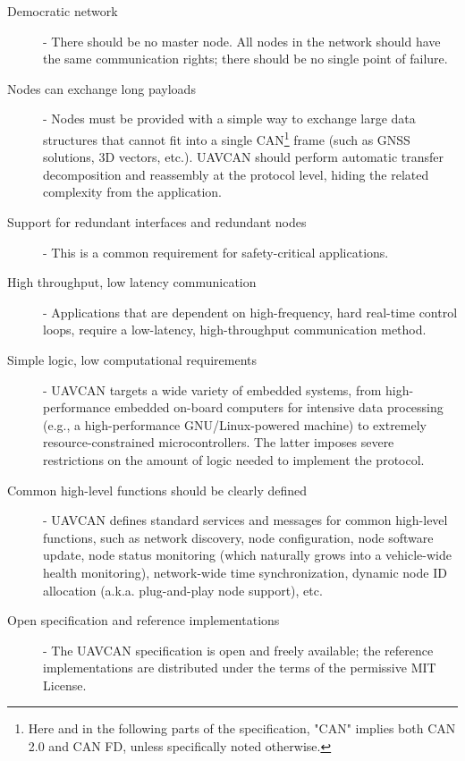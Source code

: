 \begin{description}
    \item[Democratic network] - There should be no master node.
    All nodes in the network should have the same communication rights; there should be no single point of failure.

    \item[Nodes can exchange long payloads] - Nodes must be provided with a simple way to exchange large
    data structures that cannot fit into a single CAN\footnote{Here and in the following parts of the
    specification, "CAN" implies both CAN 2.0 and CAN FD, unless specifically noted otherwise.}
    frame (such as GNSS solutions, 3D vectors, etc.).
    UAVCAN should perform automatic transfer decomposition and reassembly at the protocol level,
    hiding the related complexity from the application.

    \item[Support for redundant interfaces and redundant nodes] - This is a common requirement for
    safety-critical applications.

    \item[High throughput, low latency communication] - Applications that are dependent on high-frequency,
    hard real-time control loops, require a low-latency, high-throughput communication method.

    \item[Simple logic, low computational requirements] - UAVCAN targets a wide variety of embedded systems,
    from high-performance embedded on-board computers for intensive data processing
    (e.g., a high-performance GNU/Linux-powered machine) to extremely resource-constrained microcontrollers.
    The latter imposes severe restrictions on the amount of logic needed to implement the protocol.

    \item[Common high-level functions should be clearly defined] - UAVCAN defines standard services
    and messages for common high-level functions, such as network discovery, node configuration,
    node software update, node status monitoring (which naturally grows into a vehicle-wide health monitoring),
    network-wide time synchronization, dynamic node ID allocation (a.k.a. plug-and-play node support), etc.

    \item[Open specification and reference implementations] - The UAVCAN specification is open and
    freely available; the reference implementations are distributed under the terms of the permissive MIT License.
\end{description}

